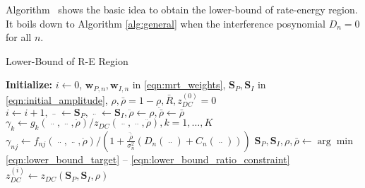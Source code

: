 Algorithm \ shows the basic idea to obtain the lower-bound of rate-energy region. It boils down to Algorithm \ref{alg:general} when the interference posynomial ${D_n} = 0$ for all $n$.

\begin{algorithm}
  \caption{Lower-Bound of R-E Region}
  \label{alg:lower-bound}
  \begin{algorithmic}[1]
    \State \textbf{Initialize:} $i \leftarrow 0$, ${{\mathbf{w}}_{P,n}},{{\mathbf{w}}_{I,n}}$ in \ref{eqn:mrt_weights}, ${{{\mathbf{S}}_P},{{\mathbf{S}}_I}}$ in \ref{eqn:initial_amplitude}, $\rho ,\bar \rho  = 1 - \rho ,\bar R,z_{DC}^{(0)} = 0$
    \Repeat
      \State $i \leftarrow i + 1,\mathop {{{\mathbf{S}}_P}}\limits^{..}  \leftarrow {{\mathbf{S}}_P},\mathop {{{\mathbf{S}}_I}}\limits^{..}  \leftarrow {{\mathbf{S}}_I},\ddot \rho  \leftarrow \rho ,\ddot \bar \rho  \leftarrow \bar \rho $
      \State ${\gamma _k} \leftarrow {g_k}\left( {\mathop {{{\mathbf{S}}_P}}\limits^{..} ,\mathop {{{\mathbf{S}}_I}}\limits^{..} ,\ddot \rho } \right)/{z_{DC}}\left( {\mathop {{{\mathbf{S}}_P}}\limits^{..} ,\mathop {{{\mathbf{S}}_I}}\limits^{..} ,\ddot \rho } \right),k = 1, \ldots ,K$
      \State ${\gamma _{nj}} \leftarrow {f_{nj}}\left( {\mathop {{{\mathbf{S}}_P}}\limits^{..} ,\mathop {{{\mathbf{S}}_I}}\limits^{..} ,\ddot \rho } \right)/\left( {1 + \frac{{\ddot \bar \rho }}{{\sigma _n^2}}\left( {{D_n}\left( {\mathop {{{\mathbf{S}}_P}}\limits^{..} } \right) + {C_n}\left( {\mathop {{{\mathbf{S}}_I}}\limits^{..} } \right)} \right)} \right)$
      \State ${{\mathbf{S}}_P},{{\mathbf{S}}_I},\rho ,\bar \rho  \leftarrow \arg \min $ \ref{eqn:lower_bound_target} -- \ref{eqn:lower_bound_ratio_constraint}
      \State $z_{DC}^{(i)} \leftarrow {z_{DC}}\left( {{{\mathbf{S}}_P},{{\mathbf{S}}_I},\rho } \right)$
  \end{algorithmic}
\end{algorithm}  